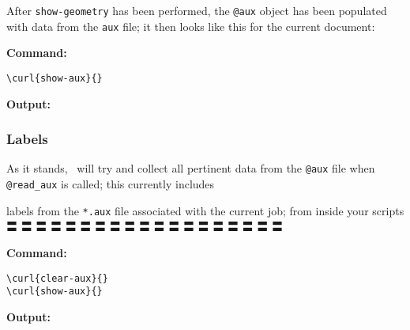 
After \verb#show-geometry# has been performed, the \verb#@aux# object has been populated with data from the
\verb#aux# file; it then looks like this for the current document:


{\textbf{Command:}}

\begin{verbatim}
\curl{show-aux}{}
\end{verbatim}

{\textbf{Output:}}



\subsubsection{Labels}\label{labels}

As it stands, \CXLTX\ will try and collect all pertinent data from the \verb#@aux# file when
\verb#@read_aux# is called; this currently includes

labels from the \verb#*.aux# file associated with the current job; from
inside your scripts 〓 〓 〓 〓 〓 〓 〓 〓 〓 〓 〓 〓 〓 〓 〓 〓 〓 〓 〓

{\textbf{Command:}}

\begin{verbatim}
\curl{clear-aux}{}
\curl{show-aux}{}
\end{verbatim}

{\textbf{Output:}}

